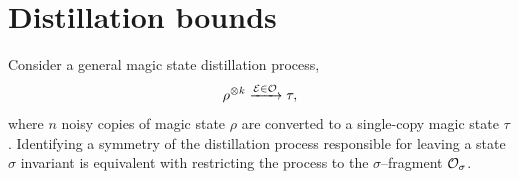 \documentclass[pra,
aps,
twocolumn,
superscriptaddress,
groupedaddress,
nofootinbib,
reprint
]{revtex4-1}
\begin{document}
%
%
%

\section{Distillation bounds}
\label{sec:distill}

Consider a general magic state distillation process,
\begin{equation}\label{eq:distprocess}
    \rho^{\otimes k} \xrightarrow{\mathcal{E} \in \mathcal{O}} \tau,
\end{equation}
where $n$ noisy copies of magic state $\rho$ are converted to a single-copy magic state $\tau$.
Identifying a symmetry of the distillation process responsible for leaving a state $\sigma$ invariant is equivalent with restricting the process to the $\sigma$--fragment $\mathcal{O}_\sigma$.
\end{document}
